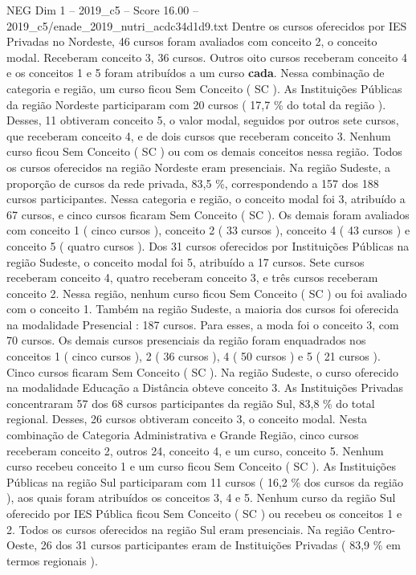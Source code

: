 \begin{textsample}{NEG Dim 1 – 2019\_c5 – Score 16.00 – 2019\_c5/enade\_2019\_nutri\_acdc34d1d9.txt}
Dentre os cursos oferecidos por IES Privadas no Nordeste, 46 cursos foram avaliados com conceito 2, o conceito modal.
Receberam conceito 3, 36 cursos.
Outros oito cursos receberam conceito 4 e os conceitos 1 e 5 foram atribuídos a um curso \textbf{cada}.
Nessa combinação de categoria e região, um curso ficou Sem Conceito ( SC ).
As Instituições Públicas da região Nordeste participaram com 20 cursos ( 17,7 \% do total da região ).
Desses, 11 obtiveram conceito 5, o valor modal, seguidos por outros sete cursos, que receberam conceito 4, e de dois cursos que receberam conceito 3.
Nenhum curso ficou Sem Conceito ( SC ) ou com os demais conceitos nessa região.
Todos os cursos oferecidos na região Nordeste eram presenciais.
Na região Sudeste, a proporção de cursos da rede privada, 83,5 \%, correspondendo a 157 dos 188 cursos participantes.
Nessa categoria e região, o conceito modal foi 3, atribuído a 67 cursos, e cinco cursos ficaram Sem Conceito ( SC ).
Os demais foram avaliados com conceito 1 ( cinco cursos ), conceito 2 ( 33 cursos ), conceito 4 ( 43 cursos ) e conceito 5 ( quatro cursos ).
Dos 31 cursos oferecidos por Instituições Públicas na região Sudeste, o conceito modal foi 5, atribuído a 17 cursos.
Sete cursos receberam conceito 4, quatro receberam conceito 3, e três cursos receberam conceito 2.
Nessa região, nenhum curso ficou Sem Conceito ( SC ) ou foi avaliado com o conceito 1.
Também na região Sudeste, a maioria dos cursos foi oferecida na modalidade Presencial : 187 cursos.
Para esses, a moda foi o conceito 3, com 70 cursos.
Os demais cursos presenciais da região foram enquadrados nos conceitos 1 ( cinco cursos ), 2 ( 36 cursos ), 4 ( 50 cursos ) e 5 ( 21 cursos ).
Cinco cursos ficaram Sem Conceito ( SC ).
Na região Sudeste, o curso oferecido na modalidade Educação a Distância obteve conceito 3.
As Instituições Privadas concentraram 57 dos 68 cursos participantes da região Sul, 83,8 \% do total regional.
Desses, 26 cursos obtiveram conceito 3, o conceito modal.
Nesta combinação de Categoria Administrativa e Grande Região, cinco cursos receberam conceito 2, outros 24, conceito 4, e um curso, conceito 5.
Nenhum curso recebeu conceito 1 e um curso ficou Sem Conceito ( SC ).
As Instituições Públicas na região Sul participaram com 11 cursos ( 16,2 \% dos cursos da região ), aos quais foram atribuídos os conceitos 3, 4 e 5.
Nenhum curso da região Sul oferecido por IES Pública ficou Sem Conceito ( SC ) ou recebeu os conceitos 1 e 2.
Todos os cursos oferecidos na região Sul eram presenciais.
Na região Centro-Oeste, 26 dos 31 cursos participantes eram de Instituições Privadas ( 83,9 \% em termos regionais ).

\end{textsample}
